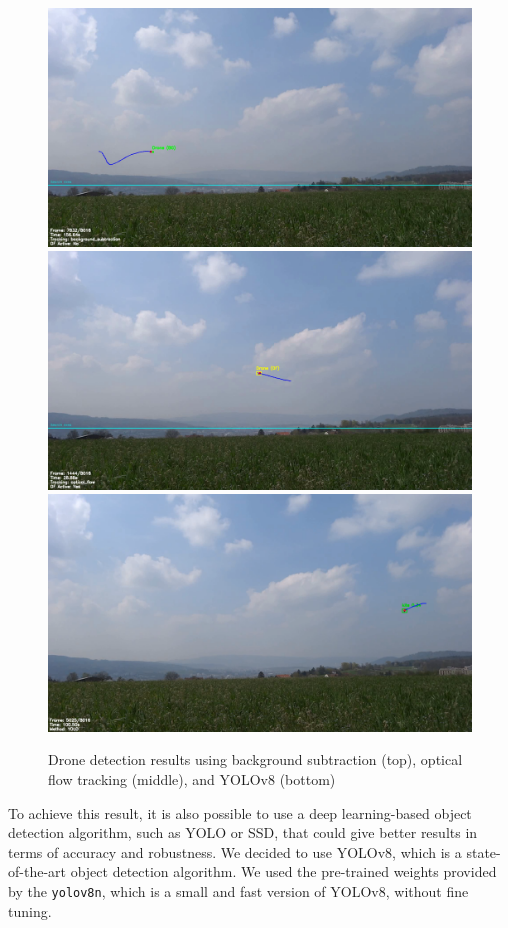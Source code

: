\documentclass[11pt]{article}
\begin{document}
\begin{figure}[H]
    \centering
    \includegraphics[width=.75\textwidth]{imgs/drone_detection_bs.png}
    \includegraphics[width=.75\textwidth]{imgs/drone_detection_of.png}
    \includegraphics[width=.75\textwidth]{imgs/drone_detection_yolo.png}
    \caption{Drone detection results using background subtraction (top), optical flow tracking (middle), and YOLOv8 (bottom)}
    \label{fig:drone_detection}
\end{figure}

To achieve this result, it is also possible to use a deep learning-based object detection algorithm, such as YOLO or SSD, that could give better results in terms of accuracy and robustness. We decided to use YOLOv8, which is a state-of-the-art object detection algorithm. We used the pre-trained weights provided by the \texttt{yolov8n}, which is a small and fast version of YOLOv8, without fine tuning.
\end{document}
